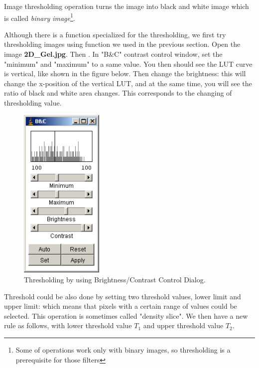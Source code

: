 Image thresholding operation turns the image into black and white image
which is called \textit{binary image}\footnote{Some of operations work only with binary images, so thresholding is a prerequisite for those filters}.

\begin{indentexercise}{1}
Although there is a function specialized for
the thresholding, we first try thresholding images using
 function
we used in the previous section. Open the image \textbf{2D\_Gel.jpg}.
Then . 
In "B\&C" contrast control window, set the "minimum" and "maximum" to a same value. You then should
see the LUT curve is vertical, like shown in the figure below. Then
change the brightness: this will change the x-position of the vertical
LUT, and at the same time, you will see the ratio of black and white
area changes. This corresponds to the changing of thresholding value.


\begin{figure}[htbp]
\begin{center}
\includegraphics[width=4cm]{img/CMCIBasicCourse201102-img106.png}
\caption{ Thresholding by using Brightness/Contrast Control Dialog.}
\label{fig:img106}
\end{center}
\end{figure}
\end{indentexercise}
 
Threshold could be also done by setting two threshold values, lower
limit and upper limit: which means that pixels with a certain range of
values could be selected. This operation is sometimes called
"density slice". We then have a new rule as follows, with lower threshold value $T_1$ and upper threshold value $T_2$.

